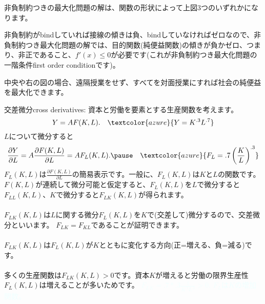 \begin{frame}[t]{}

\begin{dinglist}{43}
\vspace{1.0ex}\setlength{\itemsep}{1.0ex}\setlength{\baselineskip}{12pt}
\pause
\item	非負制約つきの最大化問題の解は、関数の形状によって上図3つのいずれかになります。
\pause
\item	非負制約がbindしていれば接線の傾きは負、bindしていなければゼロなので、非負制約つき最大化問題の解では、目的関数(純便益関数)の傾きが負かゼロ、つまり、非正であること、$f'(x)\leqslant 0$が必要です(これが非負制約つき最大化問題の一階条件first order conditionです)。
\pause
\item	中央や右の図の場合、遠隔授業をせず、すべてを対面授業にすれば社会の純便益を最大化できます。
\end{dinglist}
\end{frame}

\begin{frame}[t]{}
交差微分cross derivatives: 資本と労働を要素とする生産関数を考えます。
\[
Y=AF(K, L). \quad \textcolor{azure}{\footnotesize Y=K^{.3}L^{.7}}
\]
\pause
$L$について微分すると
\[
\frac{\partial Y}{\partial L}=A\frac{\partial F(K, L)}{\partial L}=AF_{L}(K, L). \pause
\quad \textcolor{azure}{\footnotesize F_{L}=.7\left(\frac{K}{L}\right)^{.3}}
\]
\pause
$F_{L}(K, L)$は$\frac{\partial F(K, L)}{\partial L}$の簡易表示です。一般に、$F_{L}(K, L)$は$K$と$L$の関数です。$F(K, L)$が連続して微分可能と仮定すると、$F_{L}(K, L)$を$L$で微分すると$F_{LL}(K, L)$、$K$で微分すると$F_{LK}(K, L)$が得られます。\\~\\
\pause
$F_{LK}(K, L)$は$L$に関する微分$F_{L}(K, L)$を$K$で(交差して)微分するので、交差微分といいます。\pause
$F_{LK}=F_{KL}$であることが証明できます。\\~\\
\pause
$F_{LK}(K, L)$は$F_{L}(K, L)$が$K$とともに変化する方向(正=増える、負=減る)です。\\~\\
\pause
多くの生産関数は$F_{LK}(K, L)>0$です。資本$K$が増えると労働の限界生産性$F_{L}(K, L)$は増えることが多いためです。\pause
\textcolor{azure}{\footnotesize $F_{LK}=.7*.3\frac{1}{K^{.7}L^{.3}}>0.$ $F_{L}$は$K$の増加関数。}
\end{frame}

